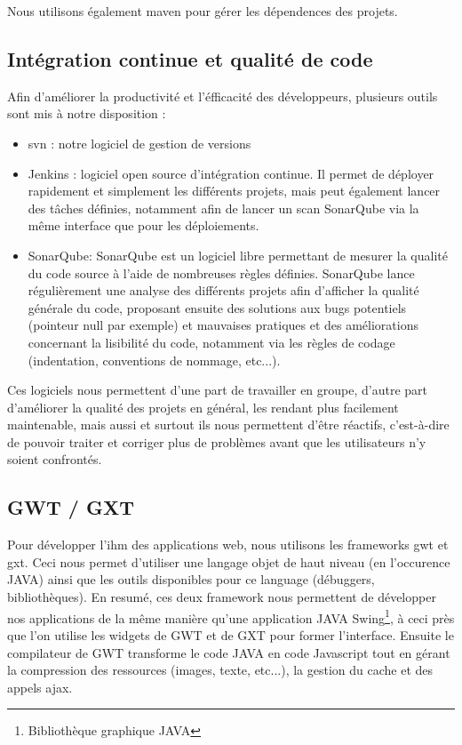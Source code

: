 \documentclass[12pt]{report}
\begin{document}
    Nous utilisons également \gls{maven} pour gérer les dépendences des projets.\vspace{-0.5em}
    \newpage    
    \subsection{Intégration continue et qualité de code}
    
    Afin d'améliorer la productivité et l'éfficacité des développeurs, plusieurs outils sont mis à notre disposition :
    \begin{itemize}[itemsep=0em]
        \item \gls{svn} : notre logiciel de gestion de versions
        \item Jenkins : logiciel open source d'intégration continue. Il permet de déployer rapidement et simplement les différents projets, mais peut également lancer des tâches définies, notamment afin de lancer un scan SonarQube via la même interface que pour les déploiements.
        \item SonarQube: SonarQube est un logiciel libre permettant de mesurer la qualité du code source à l'aide de nombreuses règles définies. SonarQube lance régulièrement une analyse des différents projets afin d'afficher la qualité générale du code, proposant ensuite des solutions aux bugs potentiels (pointeur null par exemple) et mauvaises pratiques et des améliorations concernant la lisibilité du code, notamment via les règles de codage (indentation, conventions de nommage, etc...).
    \end{itemize}
    
    Ces logiciels nous permettent d'une part de travailler en groupe, d'autre part d'améliorer la qualité des projets en général, les rendant plus facilement maintenable, mais aussi et surtout ils nous permettent d'être réactifs, c'est-à-dire de pouvoir traiter et corriger plus de problèmes avant que les utilisateurs n'y soient confrontés.
    
    \subsection{GWT / GXT}
    Pour développer l'\acrfull{ihm} des applications web, nous utilisons les frameworks \gls{gwt} et \gls{gxt}. Ceci nous permet d'utiliser une langage objet de haut niveau (en l'occurence JAVA) ainsi que les outils disponibles pour ce language (débuggers, bibliothèques). En resumé, ces deux framework nous permettent de développer nos applications de la même manière qu'une application JAVA Swing\footnote{Bibliothèque graphique JAVA}, à ceci près que l'on utilise les widgets de GWT et de GXT pour former l'interface. Ensuite le compilateur de GWT transforme le code JAVA en code Javascript tout en gérant la compression des ressources (images, texte, etc...), la gestion du cache et des appels \gls{ajax}.
    
\end{document}
